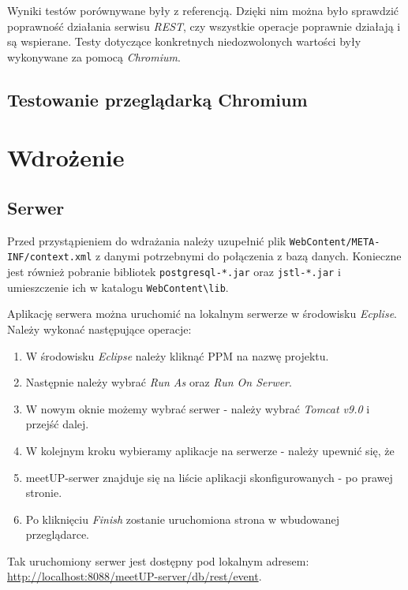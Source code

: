 \documentclass[12pt]{article}
\begin{document}
Wyniki testów porównywane były z referencją. Dzięki nim można było sprawdzić poprawność działania serwisu \textit{REST}, czy wszystkie operacje poprawnie działają i są wspierane. Testy dotyczące konkretnych niedozwolonych wartości były wykonywane za pomocą \textit{Chromium}.

\subsection{Testowanie przeglądarką Chromium}


\pagebreak
\section{Wdrożenie}

\subsection{Serwer}
Przed przystąpieniem do wdrażania należy uzupełnić plik \verb+WebContent/META-+  \verb+INF/context.xml+ z danymi potrzebnymi do połączenia z bazą danych. Konieczne jest również pobranie bibliotek \verb+postgresql-*.jar+ oraz  \verb+jstl-*.jar+ i umieszczenie ich w katalogu \verb+WebContent\lib+.

\vspace{0.5cm}

Aplikację serwera można uruchomić na lokalnym serwerze w środowisku \textit{Ecplise}. Należy wykonać następujące operacje:
\begin{enumerate}
\item W środowisku \textit{Eclipse} należy kliknąć PPM na nazwę projektu.
\item Następnie należy wybrać \textit{Run As} oraz \textit{Run On Serwer}.
\item W nowym oknie możemy wybrać serwer - należy wybrać \textit{Tomcat v9.0} i przejść dalej.
\item W kolejnym kroku wybieramy aplikacje na serwerze - należy upewnić się, że \item{meetUP-serwer} znajduje się na liście aplikacji skonfigurowanych - po prawej stronie.
\item Po kliknięciu \textit{Finish} zostanie uruchomiona strona w wbudowanej przeglądarce.
\end{enumerate}

Tak uruchomiony serwer jest dostępny pod lokalnym adresem: \url{http://localhost:8088/meetUP-server/db/rest/event}.

\vspace{0.5cm}
\end{document}
